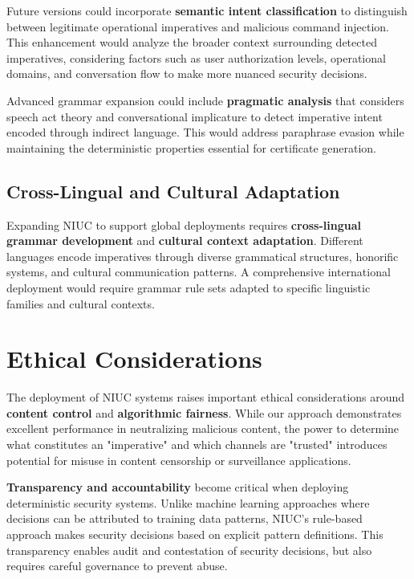 Future versions could incorporate \textbf{semantic intent classification} to distinguish between legitimate operational imperatives and malicious command injection. This enhancement would analyze the broader context surrounding detected imperatives, considering factors such as user authorization levels, operational domains, and conversation flow to make more nuanced security decisions.

Advanced grammar expansion could include \textbf{pragmatic analysis} that considers speech act theory and conversational implicature to detect imperative intent encoded through indirect language. This would address paraphrase evasion while maintaining the deterministic properties essential for certificate generation.

\subsection{Cross-Lingual and Cultural Adaptation}

Expanding NIUC to support global deployments requires \textbf{cross-lingual grammar development} and \textbf{cultural context adaptation}. Different languages encode imperatives through diverse grammatical structures, honorific systems, and cultural communication patterns. A comprehensive international deployment would require grammar rule sets adapted to specific linguistic families and cultural contexts.

\section{Ethical Considerations}

The deployment of NIUC systems raises important ethical considerations around \textbf{content control} and \textbf{algorithmic fairness}. While our approach demonstrates excellent performance in neutralizing malicious content, the power to determine what constitutes an "imperative" and which channels are "trusted" introduces potential for misuse in content censorship or surveillance applications.

\textbf{Transparency and accountability} become critical when deploying deterministic security systems. Unlike machine learning approaches where decisions can be attributed to training data patterns, NIUC's rule-based approach makes security decisions based on explicit pattern definitions. This transparency enables audit and contestation of security decisions, but also requires careful governance to prevent abuse.

